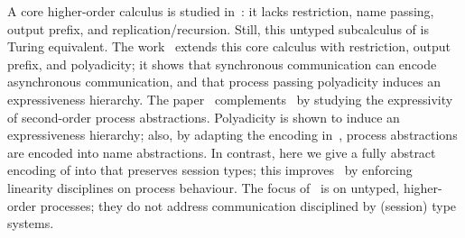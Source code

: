 \documentclass[preprint,11pt]{elsarticle}
\begin{document}
{A core higher-order calculus is studied in~\cite{DBLP:journals/iandc/LanesePSS11}: it lacks restriction,  name passing, output prefix, %
and %
replication/recursion. 
Still, this untyped subcalculus of \HO is Turing equivalent.
The work~\cite{DBLP:conf/icalp/LanesePSS10}
extends this core calculus with restriction,
output prefix, and polyadicity; it shows that 
synchronous communication can encode asynchronous communication, %
and that process passing polyadicity induces an expressiveness  hierarchy. %
The paper~\cite{DBLP:conf/wsfm/XuYL13} 
complements~\cite{DBLP:conf/icalp/LanesePSS10} 
by studying the expressivity %
of 
second-order process abstractions.
Polyadicity is shown to induce an expressiveness hierarchy; 
also,
by adapting the encoding in~\cite{SangiorgiD:expmpa},
process abstractions are encoded into name abstractions.
In contrast, here we 
give a fully abstract encoding of
 \PHOpp into \HO that preserves session types; this improves~\cite{DBLP:conf/icalp/LanesePSS10,DBLP:conf/wsfm/XuYL13}   
by enforcing linearity disciplines on process behaviour.
The focus of~\cite{DBLP:conf/icalp/LanesePSS10,XuActa2012,DBLP:conf/wsfm/XuYL13,DBLP:journals/corr/XuYL15} is on 
untyped, higher-order processes; they
do not address communication disciplined by 
(session) type systems.



}
\end{document}
